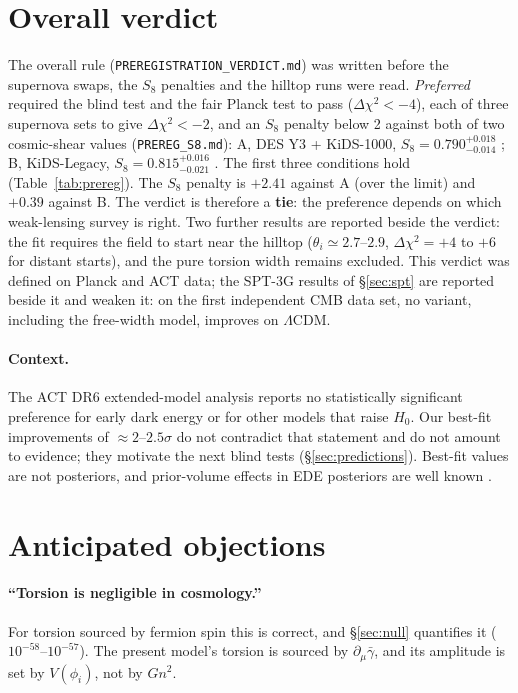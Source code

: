 \documentclass[11pt]{article}
\begin{document}
\section{Overall verdict}\label{sec:verdict}
The overall rule (\texttt{PREREGISTRATION\_VERDICT.md}) was written before the supernova swaps,
the $S_8$ penalties and the hilltop runs were read. \emph{Preferred} required the blind test and
the fair Planck test to pass ($\Delta\chi^2<-4$), each of three supernova sets to give
$\Delta\chi^2<-2$, and an $S_8$ penalty below 2 against both of two cosmic-shear values
(\texttt{PREREG\_S8.md}): A, DES Y3 + KiDS-1000, $S_8=0.790^{+0.018}_{-0.014}$ \cite{deskids2023}; B,
KiDS-Legacy, $S_8=0.815^{+0.016}_{-0.021}$ \cite{kidslegacy2025}. The first three conditions hold
(Table~\ref{tab:prereg}). The $S_8$ penalty is $+2.41$ against A (over the limit) and $+0.39$ against B.
The verdict is therefore a \textbf{tie}: the preference depends on which weak-lensing survey is
right. Two further results are reported beside the verdict: the fit requires the field to start
near the hilltop ($\theta_i\simeq2.7$--$2.9$, $\Delta\chi^2=+4$ to $+6$ for distant starts), and the
pure torsion width remains excluded. This verdict was defined on Planck and ACT data; the SPT-3G results
of \S\ref{sec:spt} are reported beside it and weaken it: on the first independent CMB data set, no
variant, including the free-width model, improves on $\Lambda$CDM.

\paragraph{Context.} The ACT DR6 extended-model analysis \cite{calabrese2025} reports no
statistically significant preference for early dark energy or for other models that raise
$H_0$. Our best-fit improvements of $\approx2$--$2.5\sigma$ do not contradict that statement and do
not amount to evidence; they motivate the next blind tests (\S\ref{sec:predictions}). Best-fit
values are not posteriors, and prior-volume effects in EDE posteriors are well known
\cite{poulin2025}.

\section{Anticipated objections}\label{sec:objections}

\paragraph{``Torsion is negligible in cosmology.''} For torsion sourced by fermion spin
this is correct, and \S\ref{sec:null} quantifies it ($10^{-58}$--$10^{-57}$). The present model's
torsion is sourced by $\partial_\mu\bar\gamma$, and its amplitude is set by $V(\phi_i)$,
not by $Gn^2$.
\end{document}
